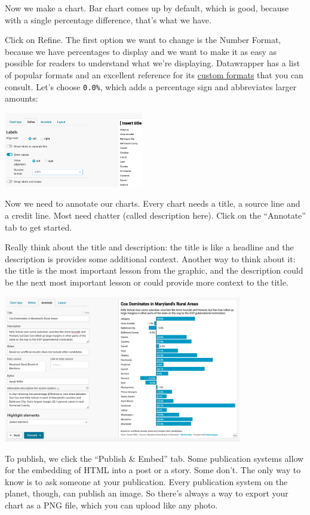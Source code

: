 \documentclass[
  letterpaper,
  DIV=11,
  numbers=noendperiod]{scrreprt}
\begin{document}
Now we make a chart. Bar chart comes up by default, which is good,
because with a single percentage difference, that's what we have.

Click on Refine. The first option we want to change is the Number
Format, because we have percentages to display and we want to make it as
easy as possible for readers to understand what we're displaying.
Datawrapper has a list of popular formats and an excellent reference for
its
\href{https://academy.datawrapper.de/article/207-custom-number-formats-that-you-can-display-in-datawrapper}{custom
formats} that you can consult. Let's choose \texttt{0.0\%}, which adds a
percentage sign and abbreviates larger amounts:

\includegraphics[width=2.4in,height=\textheight]{./images/datawrapper4.png}

Now we need to annotate our charts. Every chart needs a title, a source
line and a credit line. Most need chatter (called description here).
Click on the ``Annotate'' tab to get started.

Really think about the title and description: the title is like a
headline and the description is provides some additional context.
Another way to think about it: the title is the most important lesson
from the graphic, and the description could be the next most important
lesson or could provide more context to the title.

\includegraphics[width=4.1in,height=\textheight]{./images/datawrapper5.png}

To publish, we click the ``Publish \& Embed'' tab. Some publication
systems allow for the embedding of HTML into a post or a story. Some
don't. The only way to know is to ask someone at your publication. Every
publication system on the planet, though, can publish an image. So
there's always a way to export your chart as a PNG file, which you can
upload like any photo.
\end{document}
